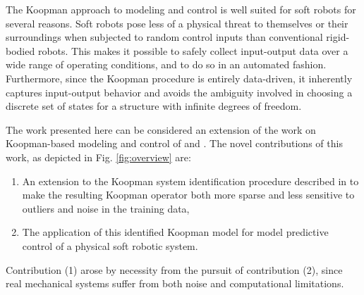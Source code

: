 The Koopman approach to modeling and control is well suited for soft robots for several reasons.
Soft robots pose less of a physical threat to themselves or their surroundings when subjected to random control inputs than conventional rigid-bodied robots. 
This makes it possible to safely collect input-output data over a wide range of operating conditions, and to do so in an automated fashion. 
Furthermore, since the Koopman procedure is entirely data-driven, it inherently captures input-output behavior and avoids the ambiguity involved in choosing a discrete set of states for a structure with infinite degrees of freedom.

The work presented here can be considered an extension of the work on Koopman-based modeling and control of \citet{mauroy2016linear} and \citet{korda2018linear}.
The novel contributions of this work, as depicted in Fig. \ref{fig:overview} are:
\begin{enumerate}
    \item An extension to the Koopman system identification procedure described in \cite{mauroy2016linear} to make the resulting Koopman operator both more sparse and less sensitive to outliers and noise in the training data,
    \item The application of this identified Koopman model for model predictive control of a physical soft robotic system.
\end{enumerate}
Contribution (1) arose by necessity from the pursuit of contribution (2), since real mechanical systems suffer from both noise and computational limitations.  



